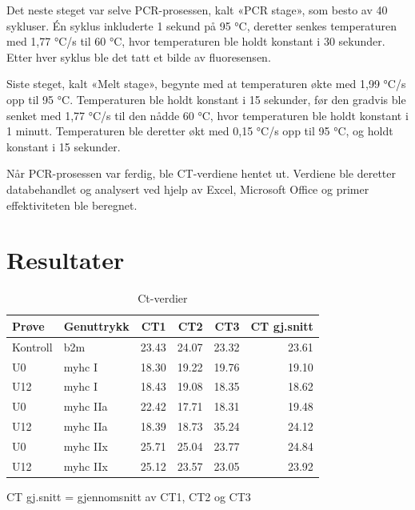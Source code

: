 \documentclass[
  letterpaper,
  DIV=11,
  numbers=noendperiod]{scrreprt}
\begin{document}
Det neste steget var selve PCR-prosessen, kalt «PCR stage», som besto av
40 sykluser. Én syklus inkluderte 1 sekund på 95 °C, deretter senkes
temperaturen med 1,77 °C/s til 60 °C, hvor temperaturen ble holdt
konstant i 30 sekunder. Etter hver syklus ble det tatt et bilde av
fluoresensen.

Siste steget, kalt «Melt stage», begynte med at temperaturen økte med
1,99 °C/s opp til 95 °C. Temperaturen ble holdt konstant i 15 sekunder,
før den gradvis ble senket med 1,77 °C/s til den nådde 60 °C, hvor
temperaturen ble holdt konstant i 1 minutt. Temperaturen ble deretter
økt med 0,15 °C/s opp til 95 °C, og holdt konstant i 15 sekunder.

Når PCR-prosessen var ferdig, ble CT-verdiene hentet ut. Verdiene ble
deretter databehandlet og analysert ved hjelp av Excel, Microsoft Office
og primer effektiviteten ble beregnet.

\section{Resultater}\label{resultater-1}

\begingroup
\fontsize{12.0pt}{14.4pt}\selectfont
\setlength{\LTpost}{0mm}

\begin{longtable}{llrrrr}

\caption{\label{tbl-ctvals}Ct-verdier}

\tabularnewline

\toprule
Prøve & Genuttrykk & CT1 & CT2 & CT3 & CT gj.snitt \\ 
\midrule\addlinespace[2.5pt]
Kontroll & b2m & 23.43 & 24.07 & 23.32 & 23.61 \\ 
U0 & myhc I & 18.30 & 19.22 & 19.76 & 19.10 \\ 
U12 & myhc I & 18.43 & 19.08 & 18.35 & 18.62 \\ 
U0 & myhc IIa & 22.42 & 17.71 & 18.31 & 19.48 \\ 
U12 & myhc IIa & 18.39 & 18.73 & 35.24 & 24.12 \\ 
U0 & myhc IIx & 25.71 & 25.04 & 23.77 & 24.84 \\ 
U12 & myhc IIx & 25.12 & 23.57 & 23.05 & 23.92 \\ 
\bottomrule

\end{longtable}

\begin{minipage}{\linewidth}
CT gj.snitt = gjennomsnitt av CT1, CT2 og CT3\\
\end{minipage}
\endgroup
\end{document}
